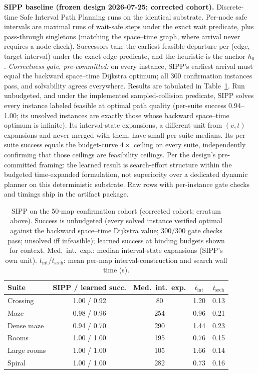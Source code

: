 \documentclass[letterpaper]{article} %
\begin{document}
\textbf{SIPP baseline (frozen design 2026-07-25; corrected cohort).} Discrete-time Safe Interval Path Planning runs on the identical substrate. Per-node safe intervals are maximal runs of wait-safe steps under the exact wait predicate, plus pass-through singletons (matching the space--time graph, where arrival never requires a node check). Successors take the earliest feasible departure per (edge, target interval) under the exact edge predicate, and the heuristic is the anchor $h_0$. \emph{Correctness gate, pre-committed:} on every instance, SIPP's earliest arrival must equal the backward space--time Dijkstra optimum; all 300 confirmation instances pass, and solvability agrees everywhere. Results are tabulated in Table~\ref{tab:sipp}. Run unbudgeted, and under the implemented sampled-collision predicate, SIPP solves every instance labeled feasible at optimal path quality (per-suite success 0.94--1.00; its unsolved instances are exactly those whose backward space--time optimum is infinite). Its interval-state expansions, a different unit from $(v,t)$ expansions and never merged with them, have small per-suite medians. Its per-suite success equals the budget-curve $4\times$ ceiling on every suite, independently confirming that those ceilings are feasibility ceilings. Per the design's pre-committed framing: the learned result is search-effort structure within the budgeted time-expanded formulation, not superiority over a dedicated dynamic planner on this deterministic substrate. Raw rows with per-instance gate checks and timings ship in the artifact package.

\begin{table}[t]
\centering
\small
\setlength{\tabcolsep}{2.6pt}
\begin{tabular}{@{}lcccc@{}}
\toprule
Suite & SIPP / learned succ. & Med.\ int.\ exp. & $t_{\mathrm{int}}$ & $t_{\mathrm{srch}}$ \\
\midrule
Crossing & 1.00 / 0.92 & 80 & 1.20 & 0.13 \\
Maze & 0.98 / 0.96 & 254 & 0.96 & 0.21 \\
Dense maze & 0.94 / 0.70 & 290 & 1.44 & 0.23 \\
Rooms & 1.00 / 1.00 & 195 & 0.76 & 0.15 \\
Large rooms & 1.00 / 1.00 & 105 & 1.66 & 0.14 \\
Spiral & 1.00 / 1.00 & 282 & 0.73 & 0.16 \\
\bottomrule
\end{tabular}
\caption{SIPP on the 50-map confirmation cohort (corrected cohort; erratum above). Success is unbudgeted (every solved instance verified optimal against the backward space--time Dijkstra value; 300/300 gate checks pass; unsolved iff infeasible); learned success at binding budgets shown for context. Med.\ int.\ exp.: median interval-state expansions (SIPP's own unit). $t_{\mathrm{int}}$/$t_{\mathrm{srch}}$: mean per-map interval-construction and search wall time (s).}
\label{tab:sipp}
\end{table}
\end{document}
